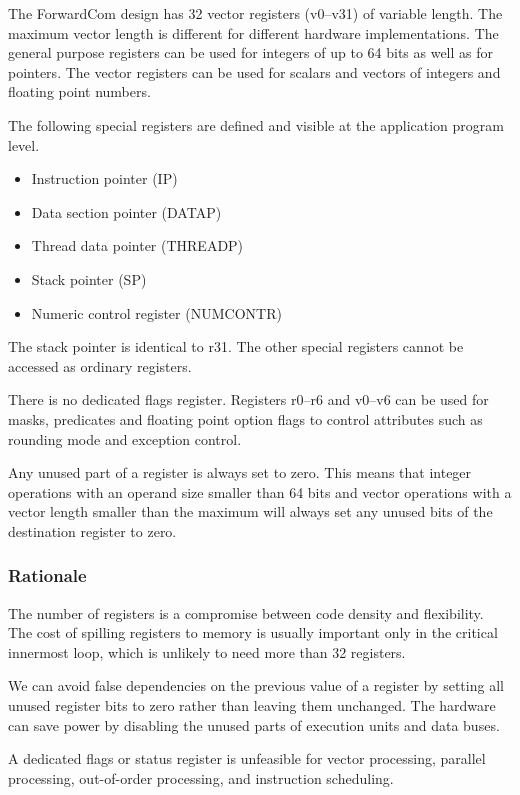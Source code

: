 \documentclass[forwardcom.tex]{subfiles}
\begin{document}
The ForwardCom design has 32 vector registers (v0--v31) of variable length. The maximum vector length is different for different hardware implementations. The general purpose registers can be used for integers of up to 64 bits as well as for pointers. The vector registers can be used for scalars and vectors of integers and floating point numbers.
\vv

The following special registers are defined and visible at the application program level.

\begin{itemize}
\item Instruction pointer (IP)
\item Data section pointer (DATAP)
\item Thread data pointer (THREADP)
\item Stack pointer (SP)
\item Numeric control register (NUMCONTR)
\end{itemize}

The stack pointer is identical to r31. The other special registers cannot be accessed as ordinary registers.
\vv

There is no dedicated flags register. Registers r0--r6 and v0--v6 can be used for masks, predicates and floating point option flags to control attributes such as rounding mode and exception control.
\vv

Any unused part of a register is always set to zero. This means that integer operations with an operand size smaller than 64 bits and vector operations with a vector length smaller than the maximum will always set any unused bits of the destination register to zero.

\subsubsection{Rationale}
The number of registers is a compromise between code density and flexibility. The cost of spilling registers to memory is usually important only in the critical innermost loop, which is unlikely to need more than 32 registers.
\vv

We can avoid false dependencies on the previous value of a register by setting all unused register bits to zero rather than leaving them unchanged. The hardware can save power by disabling the unused parts of execution units and data buses.
\vv

A dedicated flags or status register is unfeasible for vector processing, parallel processing, out-of-order processing, and instruction scheduling.
\vv
\end{document}
